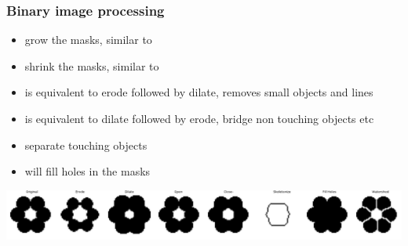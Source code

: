 \documentclass[ignorenonframetext,aspectratio=169,10pt,xcolor=table]{beamer}
\begin{document}
\begin{frame} \frametitle{Binary image processing}

  \begin{itemize} \setlength\itemsep{1em}
  \item {} grow the masks, similar to
  \item {} shrink the masks, similar to
  \item {} is equivalent to erode followed by
    dilate, removes small objects and lines
  \item {} is equivalent to dilate followed
    by erode, bridge non touching objects etc
  \item {} separate touching objects
  \item {} will fill holes in the masks
  \end{itemize}
  \begin{center} \includegraphics[width=\textwidth]{flower}
  \end{center}
\end{frame}
\end{document}

